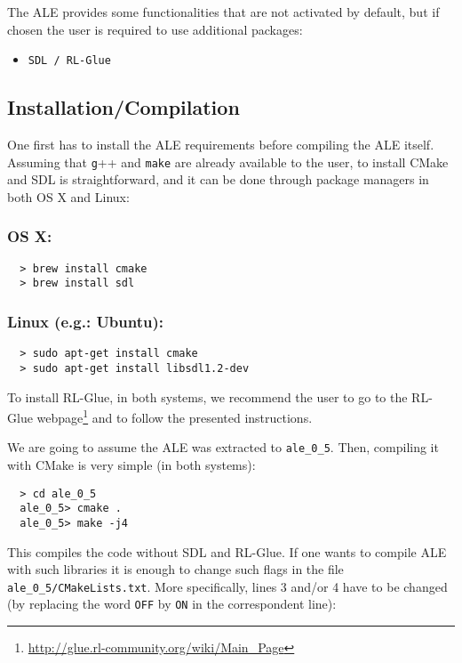 \documentclass[12pt]{article}
\begin{document}
The ALE provides some functionalities that are not activated by default, but if chosen the user is 
required to use additional packages:
\begin{itemize}
  \item \verb+SDL / RL-Glue+
\end{itemize}

\subsection{Installation/Compilation}

One first has to install the ALE requirements before compiling the ALE itself. Assuming that 
\verb+g+++ and \verb+make+ are already available to the user, to install CMake and SDL is 
straightforward, and it can be done through package managers in both OS X and Linux:

\subsubsection*{OS X:}
\begin{verbatim}
  > brew install cmake
  > brew install sdl
\end{verbatim}

\subsubsection*{Linux (e.g.: Ubuntu):}
\begin{verbatim}
  > sudo apt-get install cmake
  > sudo apt-get install libsdl1.2-dev
\end{verbatim}

To install RL-Glue, in both systems, we recommend the user to go to the RL-Glue 
webpage\footnote{\url{http://glue.rl-community.org/wiki/Main_Page}} and to follow
the presented instructions.

We are going to assume the ALE was extracted to \verb+ale_0_5+. Then, compiling it
with CMake is very simple (in both systems):
\begin{verbatim}
  > cd ale_0_5
  ale_0_5> cmake .
  ale_0_5> make -j4
\end{verbatim}

This compiles the code without SDL and RL-Glue. If one wants to compile ALE with such libraries it 
is enough to change such flags in the file \verb+ale_0_5/CMakeLists.txt+. More specifically, lines
3 and/or 4 have to be changed (by replacing the word \verb+OFF+ by \verb+ON+ in the
correspondent line):
\end{document}
